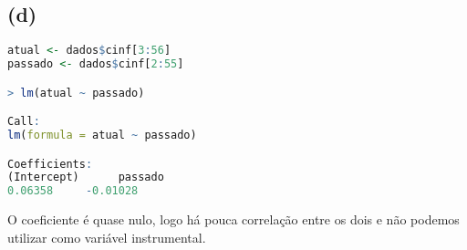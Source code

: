 \documentclass[12pt]{article}
\begin{document}
\subsection*{(d)}
\begin{lstlisting}[language=R]
atual <- dados$cinf[3:56]
passado <- dados$cinf[2:55]

> lm(atual ~ passado)

Call:
lm(formula = atual ~ passado)

Coefficients:
(Intercept)      passado  
0.06358     -0.01028  
\end{lstlisting}
O coeficiente é quase nulo, logo há pouca correlação entre os dois e não podemos utilizar como variável instrumental.
\end{document}
